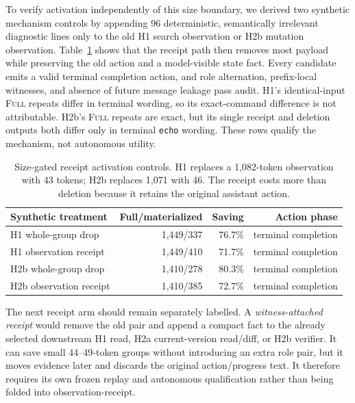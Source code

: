 \documentclass[11pt]{article}
\begin{document}
To verify activation independently of this size boundary, we derived two
synthetic mechanism controls by appending 96 deterministic, semantically
irrelevant diagnostic lines only to the old H1 search observation or H2b
mutation observation.  Table~\ref{tab:receipt-activation} shows that the
receipt path then removes most payload while preserving the old action and a
model-visible state fact.  Every candidate emits a valid terminal completion
action, and role alternation, prefix-local witnesses, and absence of future
message leakage pass audit.  H1's identical-input \textsc{Full} repeats differ
in terminal wording, so its exact-command difference is not attributable.
H2b's \textsc{Full} repeats are exact, but its single receipt and deletion
outputs both differ only in terminal \texttt{echo} wording.  These rows qualify
the mechanism, not autonomous utility.

\begin{table}[H]
\centering
\small
\begin{tabular}{lrrr}
\toprule
Synthetic treatment & Full/materialized & Saving & Action phase \\
\midrule
H1 whole-group drop & 1,449/337 & 76.7\% & terminal completion \\
H1 observation receipt & 1,449/410 & 71.7\% & terminal completion \\
H2b whole-group drop & 1,410/278 & 80.3\% & terminal completion \\
H2b observation receipt & 1,410/385 & 72.7\% & terminal completion \\
\bottomrule
\end{tabular}
\caption{Size-gated receipt activation controls.  H1 replaces a 1,082-token
observation with 43 tokens; H2b replaces 1,071 with 46.  The receipt costs more
than deletion because it retains the original assistant action.}
\label{tab:receipt-activation}
\end{table}

The next receipt arm should remain separately labelled.  A
\emph{witness-attached receipt} would remove the old pair and append a compact
fact to the already selected downstream H1 read, H2a current-version read/diff,
or H2b verifier.  It can save small 44--49-token groups without introducing an
extra role pair, but it moves evidence later and discards the original
action/progress text.  It therefore requires its own frozen replay and
autonomous qualification rather than being folded into observation-receipt.
\end{document}
